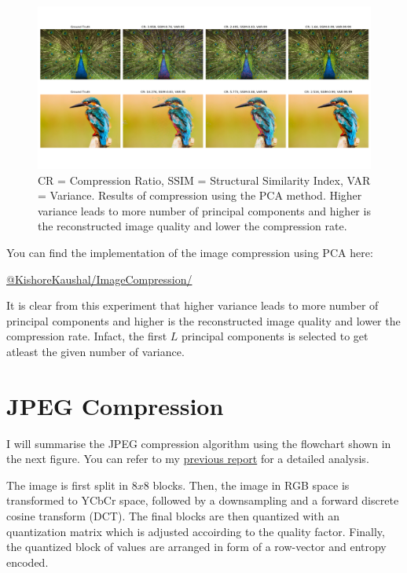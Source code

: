\begin{figure}[!ht]
    \label{fig:imageCompressionUsingPCA}
    \centering
    \includegraphics[width=1\textwidth]{../fig/midsemwork/ImageCompressionWithPCA.png}
    \caption{CR = Compression Ratio, SSIM = Structural Similarity Index, VAR = Variance. Results of compression using the PCA method. Higher variance leads to more number of principal components and higher is the reconstructed image quality and lower the compression rate.}
    
\end{figure}

You can find the implementation of the image compression using PCA here:

\href{https://github.com/KishoreKaushal/ImageCompression/tree/master/PCA}{@KishoreKaushal/ImageCompression/}

It is clear from this experiment that higher variance leads to more number of principal components and higher is the reconstructed image quality and lower the compression rate. Infact, the first $L$ principal components is selected to get atleast the given number of variance.

\section{JPEG Compression}

I will summarise the JPEG compression algorithm using the flowchart shown in the next figure.
You can refer to my \href{https://github.com/KishoreKaushal/btp-report-phase2/blob/master/btp_report.pdf}{previous report} for a detailed analysis.

The image is first split in $8x8$ blocks. 
Then, the image in RGB space is transformed to YCbCr space, followed by a downsampling and a forward discrete cosine transform (DCT). 
The final blocks are then quantized with an quantization matrix which is adjusted accoirding to the quality factor. 
Finally, the quantized block of values are arranged in form of a row-vector and entropy encoded.

